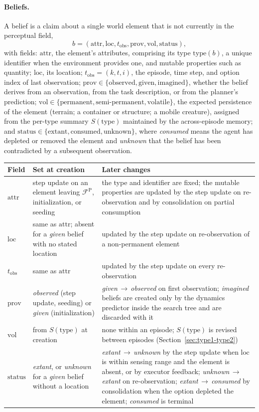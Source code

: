 \documentclass[11pt]{article}
\makeatletter
\newcommand{\calF}{\mathcal{F}}
\newcommand{\FP}{\calF^{\mathrm{P}}}
\newcommand{\loc}{\mathrm{loc}}
\newcommand{\prov}{\mathrm{prov}}
\newcommand{\vol}{\mathrm{vol}}
\newcommand{\stat}{\mathrm{status}}
\newcommand{\attr}{\mathrm{attr}}
\newcommand{\type}{\mathrm{type}}
\newcommand{\tobs}{t_{\mathrm{obs}}}
\newenvironment{lifecycle}{\begin{center}\small\begin{tabular}{@{}>{\raggedright\arraybackslash}p{0.17\textwidth}>{\raggedright\arraybackslash}p{0.36\textwidth}>{\raggedright\arraybackslash}p{0.40\textwidth}@{}}\toprule Field & Set at creation & Later changes \\ \midrule}{\bottomrule\end{tabular}\end{center}}
\makeatother
\begin{document}
\paragraph{Beliefs.}
A belief is a claim about a single world element that is not currently in the perceptual field,
\begin{equation}
b=(\attr,\loc,\tobs,\prov,\vol,\stat),
\label{eq:belief}
\end{equation}
with fields: $\attr$, the element's attributes, comprising its type $\type(b)$, a unique identifier when the environment provides one, and mutable properties such as quantity; $\loc$, its location; $\tobs=(k,t,i)$, the episode, time step, and option index of last observation; $\prov\in\{\mathrm{observed},\mathrm{given},\mathrm{imagined}\}$, whether the belief derives from an observation, from the task description, or from the planner's prediction; $\vol\in\{\mathrm{permanent},\mathrm{semi\text{-}permanent},\mathrm{volatile}\}$, the expected persistence of the element (terrain; a container or structure; a mobile creature), assigned from the per-type summary $S(\type)$ maintained by the across-episode memory; and $\stat\in\{\mathrm{extant},\mathrm{consumed},\mathrm{unknown}\}$, where \emph{consumed} means the agent has depleted or removed the element and \emph{unknown} that the belief has been contradicted by a subsequent observation. 

\begin{lifecycle}
$\attr$ & step update on an element leaving $\FP$, initialization, or seeding & the type and identifier are fixed; the mutable properties are updated by the step update on re-observation and by consolidation on partial consumption \\
$\loc$ & same as $\attr$; absent for a \emph{given} belief with no stated location & updated by the step update on re-observation of a non-permanent element \\
$\tobs$ & same as $\attr$ & updated by the step update on every re-observation \\
$\prov$ & \emph{observed} (step update, seeding) or \emph{given} (initialization) & \emph{given}\,$\to$\,\emph{observed} on first observation; \emph{imagined} beliefs are created only by the dynamics predictor inside the search tree and are discarded with it \\
$\vol$ & from $S(\type)$ at creation & none within an episode; $S(\type)$ is revised between episodes (Section~\ref{sec:type1-type2}) \\
$\stat$ & \emph{extant}, or \emph{unknown} for a \emph{given} belief without a location & \emph{extant}\,$\to$\,\emph{unknown} by the step update when $\loc$ is within sensing range and the element is absent, or by executor feedback; \emph{unknown}\,$\to$\,\emph{extant} on re-observation; \emph{extant}\,$\to$\,\emph{consumed} by consolidation when the option depleted the element; \emph{consumed} is terminal \\
\end{lifecycle}
\end{document}
